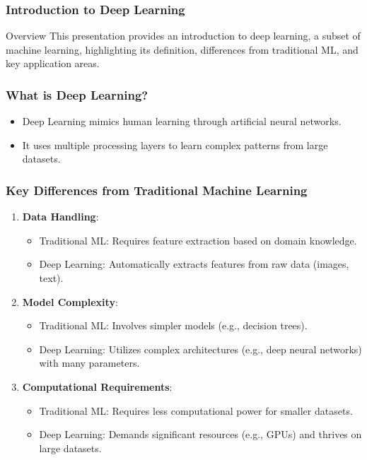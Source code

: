 \documentclass[aspectratio=169]{beamer}
\begin{document}
\begin{frame}
  \frametitle{Introduction to Deep Learning}
  \begin{block}{Overview}
    This presentation provides an introduction to deep learning, a subset of machine learning, highlighting its definition, differences from traditional ML, and key application areas.
  \end{block}
\end{frame}

\begin{frame}
  \frametitle{What is Deep Learning?}
  \begin{itemize}
    \item Deep Learning mimics human learning through artificial neural networks.
    \item It uses multiple processing layers to learn complex patterns from large datasets.
  \end{itemize}
\end{frame}

\begin{frame}
  \frametitle{Key Differences from Traditional Machine Learning}
  \begin{enumerate}
    \item \textbf{Data Handling}:
      \begin{itemize}
        \item Traditional ML: Requires feature extraction based on domain knowledge.
        \item Deep Learning: Automatically extracts features from raw data (images, text).
      \end{itemize}
    \item \textbf{Model Complexity}:
      \begin{itemize}
        \item Traditional ML: Involves simpler models (e.g., decision trees).
        \item Deep Learning: Utilizes complex architectures (e.g., deep neural networks) with many parameters.
      \end{itemize}
    \item \textbf{Computational Requirements}:
      \begin{itemize}
        \item Traditional ML: Requires less computational power for smaller datasets.
        \item Deep Learning: Demands significant resources (e.g., GPUs) and thrives on large datasets.
      \end{itemize}
  \end{enumerate}
\end{frame}
\end{document}
